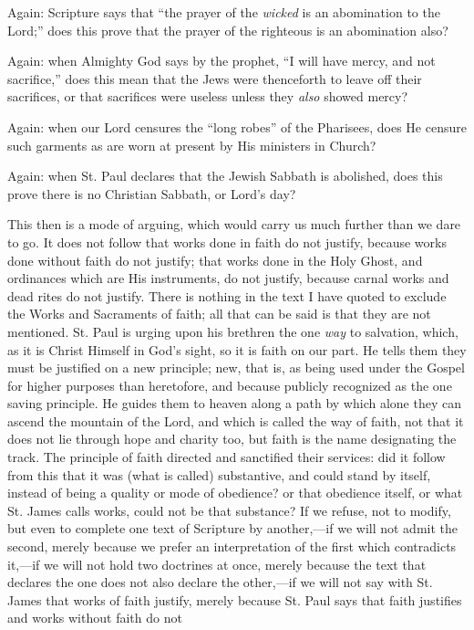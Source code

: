 Again: Scripture says that ``the prayer of the \emph{wicked} is
an abomination to the Lord;'' does this prove that the prayer of
the righteous is an abomination also?

Again: when Almighty God says by the prophet, ``I will have
mercy, and not sacrifice,'' does this mean that the Jews were
thenceforth to leave off their sacrifices, or that sacrifices were
useless unless they \emph{also} showed mercy?

Again: when our Lord censures the ``long robes'' of the
Pharisees, does He censure such garments as are worn at present by His
ministers in Church?

Again: when St. Paul declares that the Jewish Sabbath is abolished,
does this prove there is no Christian Sabbath, or Lord's day?

This then is a mode of arguing, which would carry us much
further than we dare to go. It does not follow that works done in
faith do not justify, because works done without faith do not justify;
that works done in the Holy Ghost, and ordinances which are His
instruments, do not justify, because carnal works and dead rites do
not justify. There is nothing in the text I have quoted to exclude the
Works and Sacraments of faith; all that can be said is that they are
not mentioned. St. Paul is urging upon his brethren the one \emph{way}
to salvation, which, as it is Christ Himself in God's sight, so it is
faith on our part. He tells them they must be justified on a new
principle; new, that is, as being used under the Gospel for higher
purposes than heretofore, and because publicly recognized as the one
saving principle. He guides them to heaven along a path by which alone
they can ascend the mountain of the Lord, and which is called the way
of faith, not that it does not lie through hope and charity too, but
faith is the name designating the track. The principle of faith
directed and sanctified their services: did it follow from this that
it was (what is called) substantive, and could stand by itself,
instead of being a quality or mode of obedience? or that obedience
itself, or what St. James calls works, could not be that substance? If
we refuse, not to modify, but even to complete one text of Scripture
by another,—if we will not admit the second, merely because we
prefer an interpretation of the first which contradicts it,—if we
will not hold two doctrines at once, merely because the text that
declares the one does not also declare the other,—if we will not say
with St. James that works of faith justify, merely because St. Paul
says that faith justifies and works without faith do not
